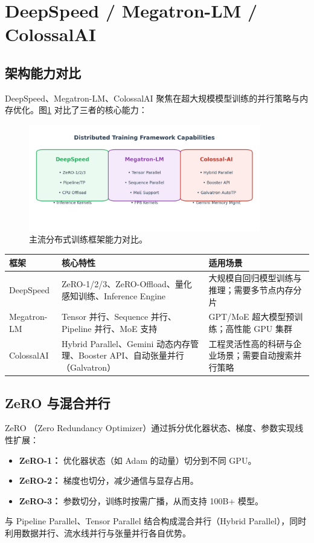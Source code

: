 \documentclass[UTF8,zihao=-4]{ctexart}
\begin{document}
\section{DeepSpeed / Megatron-LM / ColossalAI}
\subsection{架构能力对比}
DeepSpeed、Megatron-LM、ColossalAI 聚焦在超大规模模型训练的并行策略与内存优化。图\ref{fig:distributed_landscape_cn} 对比了三者的核心能力：
\begin{figure}[H]
  \centering
  \includegraphics[width=0.9\textwidth]{distributed_frameworks.png}
  \caption{主流分布式训练框架能力对比。}
  \label{fig:distributed_landscape_cn}
\end{figure}
\begin{longtable}{p{3cm}p{5cm}p{6cm}}
\toprule
框架 & 核心特性 & 适用场景 \\
\midrule
DeepSpeed & ZeRO-1/2/3、ZeRO-Offload、量化感知训练、Inference Engine & 大规模自回归模型训练与推理；需要多节点内存分片 \\
Megatron-LM & Tensor 并行、Sequence 并行、Pipeline 并行、MoE 支持 & GPT/MoE 超大模型预训练；高性能 GPU 集群 \\
ColossalAI & Hybrid Parallel、Gemini 动态内存管理、Booster API、自动张量并行（Galvatron） & 工程灵活性高的科研与企业场景；需要自动搜索并行策略 \\
\bottomrule
\end{longtable}

\subsection{ZeRO 与混合并行}
ZeRO （Zero Redundancy Optimizer）通过拆分优化器状态、梯度、参数实现线性扩展：
\begin{itemize}
  \item \textbf{ZeRO-1：} 优化器状态（如 Adam 的动量）切分到不同 GPU。
  \item \textbf{ZeRO-2：} 梯度也切分，减少通信与显存占用。
  \item \textbf{ZeRO-3：} 参数切分，训练时按需广播，从而支持 100B+ 模型。
\end{itemize}
与 Pipeline Parallel、Tensor Parallel 结合构成混合并行（Hybrid Parallel），同时利用数据并行、流水线并行与张量并行各自优势。
\end{document}
